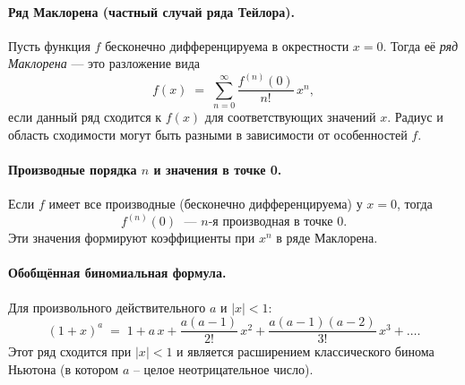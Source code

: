 
\paragraph{Ряд Маклорена (частный случай ряда Тейлора).}
Пусть функция $f$ бесконечно дифференцируема в окрестности $x=0$.
Тогда её \emph{ряд Маклорена} --- это разложение вида
\[
	f(x) \;=\; \sum_{n=0}^\infty \frac{f^{(n)}(0)}{n!}\,x^n,
\]
если данный ряд сходится к $f(x)$ для соответствующих значений $x$.
Радиус и область сходимости могут быть разными в зависимости от особенностей $f$.

\bigskip

\paragraph{Производные порядка $n$ и значения в точке 0.}
Если $f$ имеет все производные (бесконечно дифференцируема) у $x=0$, тогда
\[
	f^{(n)}(0)
	\;\text{ --- } n\text{-я производная в точке }0.
\]
Эти значения формируют коэффициенты при $x^n$ в ряде Маклорена.

\bigskip

\paragraph{Обобщённая биномиальная формула.}
Для произвольного действительного $a$ и $|x|<1$:
\[
	(1+x)^a
	\;=\;
	1
	+ a\,x
	+ \frac{a(a-1)}{2!}\,x^2
	+ \frac{a(a-1)(a-2)}{3!}\,x^3 + \dots.
\]
Этот ряд сходится при $|x|<1$ и является расширением классического бинома Ньютона (в котором $a$ -- целое неотрицательное число).
